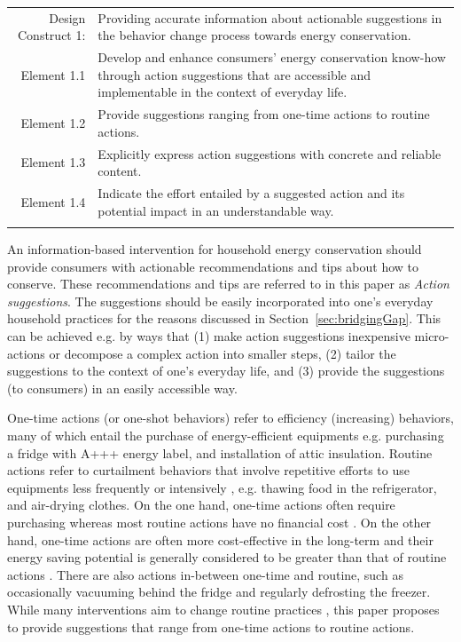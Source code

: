 \documentclass[a4paper]{article}
\begin{document}
\begin{table}[h!]
\def\arraystretch{1.5}
\begin{tabularx}{\textwidth}{!{\color{gray!40}\vrule} r X !{\color{gray!40}\vrule}}
\hline
{} Design Construct 1:  &  Providing accurate information about actionable suggestions in the behavior change process towards energy conservation. \\  \hline
Element 1.1 & Develop and enhance consumers' energy conservation know-how through action suggestions that are accessible and implementable in the context of everyday life.\\
Element 1.2 & Provide suggestions ranging from one-time actions to routine actions.\\
Element 1.3 & Explicitly express action suggestions with concrete and reliable content.\\
Element 1.4 & Indicate the effort entailed by a suggested action and its potential impact in an understandable way.\\ \hline
\end{tabularx}
\end{table}


An information-based intervention for household energy conservation should provide consumers with actionable recommendations and tips about how to conserve. These recommendations and tips are referred to in this paper as \textit{Action suggestions}. The suggestions should be easily incorporated into one's everyday household practices for the reasons discussed in Section~\ref{sec:bridgingGap}. This can be achieved e.g. by ways that (1) make action suggestions inexpensive micro-actions or decompose a complex action into smaller steps, (2) tailor the suggestions to the context of one's everyday life, and (3) provide the suggestions (to consumers) in an easily accessible way. 

One-time actions (or one-shot behaviors) refer to efficiency (increasing) behaviors, many of which entail the purchase of energy-efficient equipments \citep{Abrahamse2005,Gardner2008} 
e.g. purchasing a fridge with A+++ energy label, and installation of attic insulation. Routine actions refer to curtailment behaviors that involve repetitive efforts to use equipments less frequently or intensively \citep{Abrahamse2005,Gardner2008}, e.g. thawing food in the refrigerator, and air-drying clothes. On the one hand, one-time actions often require purchasing %
whereas most routine actions have no financial cost \citep{Abrahamse2005,Gardner2008}. On the other hand, one-time actions are often more cost-effective in the long-term \citep{Froehlich2009} and their energy saving potential is generally considered to be greater than that of routine actions \citep{Abrahamse2005,Gardner2008}. There are also actions in-between one-time and routine, such as occasionally vacuuming behind the fridge and regularly defrosting the freezer. While many interventions aim to change routine practices \citep{Froehlich2009}, this paper proposes to provide suggestions that range from one-time actions to routine actions. 
\end{document}
